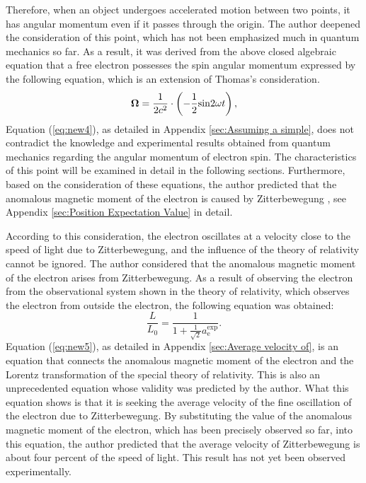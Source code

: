 \documentclass[%
 reprint,
 amsmath,amssymb,
 aps,
]{revtex4-1}
\numberwithin{equation}{section}%
\begin{document}
Therefore, when an object undergoes accelerated motion between two points, it has angular momentum even if it passes through the origin. The author deepened the consideration of this point, which has not been emphasized much in quantum mechanics so far. As a result, it was derived from the above closed algebraic equation that a free electron possesses the spin angular momentum expressed by the following equation, which is an extension of Thomas's consideration.
\begin{equation}
{\bf \Omega} = \frac{1}{2 c^2} \cdot \left( - \frac{1}{2} \mathrm{sin}2\omega t \right),
\label{eq:new4}
\end{equation}
Equation (\ref{eq:new4}), as detailed in Appendix \ref{sec:Assuming a simple}, does not contradict the knowledge and experimental results obtained from quantum mechanics regarding the angular momentum of electron spin. The characteristics of this point will be examined in detail in the following sections. Furthermore, based on the consideration of these equations, the author predicted that the anomalous magnetic moment of the electron is caused by Zitterbewegung , see Appendix \ref{sec:Position Expectation Value} in detail.

According to this consideration, the electron oscillates at a velocity close to the speed of light due to Zitterbewegung, and the influence of the theory of relativity cannot be ignored. The author considered that the anomalous magnetic moment of the electron arises from Zitterbewegung. As a result of observing the electron from the observational system shown in the theory of relativity, which observes the electron from outside the electron, the following equation was obtained:
\begin{equation}
\frac{L}{L_0} = \frac{1}{1 + \frac{1}{\sqrt{2}}a^{\text{exp}}_{\text{e}}} .
\label{eq:new5}
\end{equation}
Equation (\ref{eq:new5}), as detailed in Appendix \ref{sec:Average velocity of}, is an equation that connects the anomalous magnetic moment of the electron and the Lorentz transformation of the special theory of relativity. This is also an unprecedented equation whose validity was predicted by the author. What this equation shows is that it is seeking the average velocity of the fine oscillation of the electron due to Zitterbewegung. By substituting the value of the anomalous magnetic moment of the electron, which has been precisely observed so far, into this equation, the author predicted that the average velocity of Zitterbewegung is about four percent of the speed of light. This result has not yet been observed experimentally.
\end{document}
